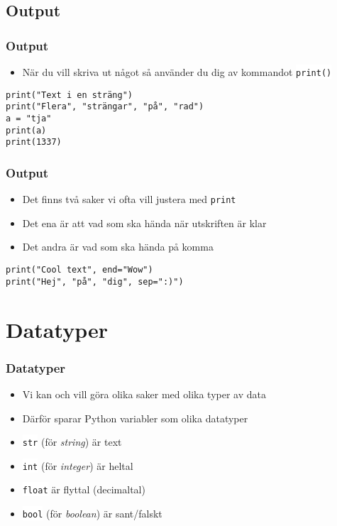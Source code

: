 \documentclass[aspectratio=169]{beamer}
\newcommand{\code}[1]{\colorbox{white}{\lstinline{#1}}}
\begin{document}
\subsection{Output}

\begin{frame}[fragile]
	\frametitle{Output}
	
	\begin{itemize}
		\item När du vill skriva ut något så använder du dig av kommandot \code{print()}
	\end{itemize}
	
	\begin{lstlisting}
print("Text i en sträng")
print("Flera", "strängar", "på", "rad")
a = "tja"
print(a)
print(1337)
	\end{lstlisting}
	
\end{frame}

\begin{frame}[fragile]
	\frametitle{Output}
	
	\begin{itemize}
		\item Det finns två saker vi ofta vill justera med \code{print}
		\item Det ena är att vad som ska hända när utskriften är klar
		\item Det andra är vad som ska hända på komma
	\end{itemize}
	
	\begin{lstlisting}
print("Cool text", end="Wow")
print("Hej", "på", "dig", sep=":)")
	\end{lstlisting}
	
\end{frame}

\section{Datatyper}

\begin{frame}
	\frametitle{Datatyper}
	
	\begin{itemize}
		\item Vi kan och vill göra olika saker med olika typer av data
		\item Därför sparar Python variabler som olika datatyper
		\item \code{str} (för \textit{string}) är text
		\item \code{int} (för \textit{integer}) är heltal
		\item \code{float} är flyttal (decimaltal)
		\item \code{bool} (för \textit{boolean}) är sant/falskt
	\end{itemize}
	
\end{frame}
\end{document}
